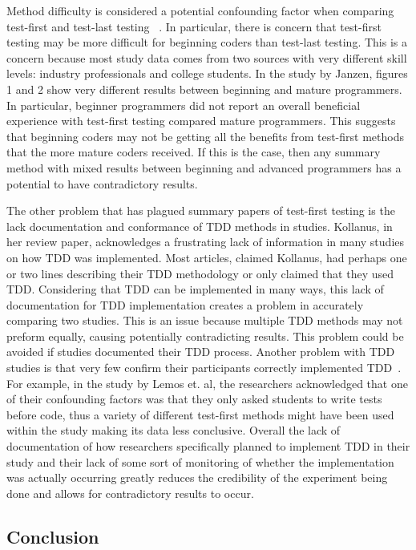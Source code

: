 \documentclass{sig-alternate}
\begin{document}
Method difficulty is considered a potential confounding factor when comparing test-first and test-last testing ~\cite{Hammond:2012, Kettunen:2010}. In particular, there is concern that test-first testing may be more difficult for beginning coders than test-last testing.  This is a concern because most study data comes from two sources with very different skill levels: industry professionals and college students.  In the study by Janzen, figures 1 and 2 show very different results between beginning and mature programmers.  In particular, beginner programmers did not report an overall beneficial experience with test-first testing compared mature programmers.  This suggests that beginning coders may not be getting all the benefits from test-first methods that the more mature coders received.  If this is the case, then any summary method with mixed results between beginning and advanced programmers has a potential to have contradictory results.


The other problem that has plagued summary papers of test-first testing is the lack documentation  and conformance of TDD methods in studies.  Kollanus, in her review paper, acknowledges a frustrating lack of information in many studies on how TDD was implemented.  Most articles, claimed Kollanus, had perhaps one or two lines describing their TDD methodology or only claimed that they used TDD.  Considering that TDD can be implemented in many ways, this lack of documentation for TDD implementation creates a problem in accurately comparing two studies.  This is an issue because multiple TDD methods may not preform equally, causing potentially contradicting results.  This problem could be avoided if studies documented their TDD process.  Another problem with TDD studies is that very few confirm their participants correctly implemented TDD~\cite{Hammond:2012}.  For example, in the study by Lemos et. al, the researchers acknowledged that one of their confounding factors was that they only asked students to write tests before code, thus a variety of different test-first methods might have been used within the study making its data less conclusive.   Overall the lack of documentation of how researchers specifically planned to implement TDD in their study and their lack of some sort of monitoring of whether the implementation was actually occurring greatly reduces the credibility of the experiment being done and allows for contradictory results to occur. 

\subsection{Conclusion}
\end{document}
